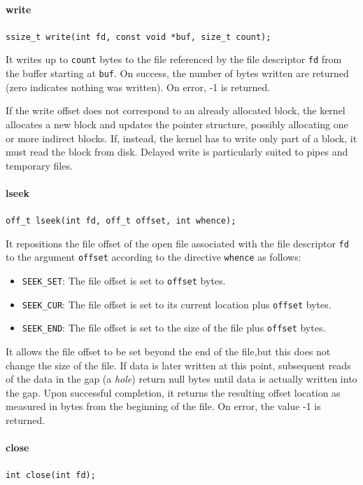 \paragraph{write}
\texttt{ssize\_t write(int fd, const void *buf, size\_t count);}

It writes up to \texttt{count} bytes to the file referenced by the file descriptor \texttt{fd} from the buffer starting at \texttt{buf}. On success, the number of bytes written are returned (zero indicates nothing was written). On error, -1 is returned.

If the write offset does not correspond to an already allocated block, the kernel allocates a new block and updates the pointer structure, possibly allocating one or more indirect blocks. If, instead, the kernel has to write only part of a block, it must read the block from disk. Delayed write is particularly suited to pipes and temporary files.

\paragraph{lseek}
\texttt{off\_t lseek(int fd, off\_t offset, int whence);}

It repositions the file offset of the open file associated with the file descriptor \texttt{fd} to the argument \texttt{offset} according to the directive \texttt{whence} as follows:
\begin{itemize}
\item \texttt{SEEK\_SET}: The file offset is set to \texttt{offset} bytes.
\item \texttt{SEEK\_CUR}: The file offset is set to its current location plus \texttt{offset} bytes.
\item \texttt{SEEK\_END}: The file offset is set to the size of the file plus \texttt{offset} bytes.
\end{itemize}
It allows the file offset to be set beyond the end of the file,but this does not change the size of the file. If data is later written at this point, subsequent reads of the data in the gap (a \emph{hole}) return null bytes until data is actually written into the gap. Upon successful completion, it returns the resulting offset location as measured in bytes from the beginning of the file.  On error, the value -1 is returned.

\paragraph{close}
\texttt{int close(int fd);}

